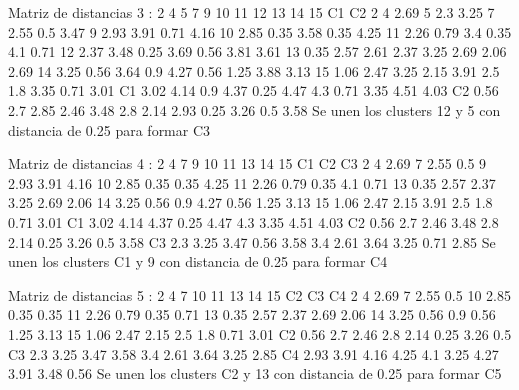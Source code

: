 \documentclass[a4paper, 12pt]{article}
\begin{document}
\begin{itemize}
\begin{Schunk}
\begin{Soutput}
Matriz de distancias 3 :
   2    4    5    7    9    10   11   12   13   14   15   C1   C2
2                                                                
4  2.69                                                          
5  2.3  3.25                                                     
7  2.55 0.5  3.47                                                
9  2.93 3.91 0.71 4.16                                           
10 2.85 0.35 3.58 0.35 4.25                                      
11 2.26 0.79 3.4  0.35 4.1  0.71                                 
12 2.37 3.48 0.25 3.69 0.56 3.81 3.61                            
13 0.35 2.57 2.61 2.37 3.25 2.69 2.06 2.69                       
14 3.25 0.56 3.64 0.9  4.27 0.56 1.25 3.88 3.13                  
15 1.06 2.47 3.25 2.15 3.91 2.5  1.8  3.35 0.71 3.01             
C1 3.02 4.14 0.9  4.37 0.25 4.47 4.3  0.71 3.35 4.51 4.03        
C2 0.56 2.7  2.85 2.46 3.48 2.8  2.14 2.93 0.25 3.26 0.5  3.58   
Se unen los clusters 12 y 5 con distancia de 0.25 para formar C3 

Matriz de distancias 4 :
   2    4    7    9    10   11   13   14   15   C1   C2   C3
2                                                           
4  2.69                                                     
7  2.55 0.5                                                 
9  2.93 3.91 4.16                                           
10 2.85 0.35 0.35 4.25                                      
11 2.26 0.79 0.35 4.1  0.71                                 
13 0.35 2.57 2.37 3.25 2.69 2.06                            
14 3.25 0.56 0.9  4.27 0.56 1.25 3.13                       
15 1.06 2.47 2.15 3.91 2.5  1.8  0.71 3.01                  
C1 3.02 4.14 4.37 0.25 4.47 4.3  3.35 4.51 4.03             
C2 0.56 2.7  2.46 3.48 2.8  2.14 0.25 3.26 0.5  3.58        
C3 2.3  3.25 3.47 0.56 3.58 3.4  2.61 3.64 3.25 0.71 2.85   
Se unen los clusters C1 y 9 con distancia de 0.25 para formar C4 

Matriz de distancias 5 :
   2    4    7    10   11   13   14   15   C2   C3   C4
2                                                      
4  2.69                                                
7  2.55 0.5                                            
10 2.85 0.35 0.35                                      
11 2.26 0.79 0.35 0.71                                 
13 0.35 2.57 2.37 2.69 2.06                            
14 3.25 0.56 0.9  0.56 1.25 3.13                       
15 1.06 2.47 2.15 2.5  1.8  0.71 3.01                  
C2 0.56 2.7  2.46 2.8  2.14 0.25 3.26 0.5              
C3 2.3  3.25 3.47 3.58 3.4  2.61 3.64 3.25 2.85        
C4 2.93 3.91 4.16 4.25 4.1  3.25 4.27 3.91 3.48 0.56   
Se unen los clusters C2 y 13 con distancia de 0.25 para formar C5 


\end{Soutput}
\end{Schunk}
\end{itemize}
\end{document}
